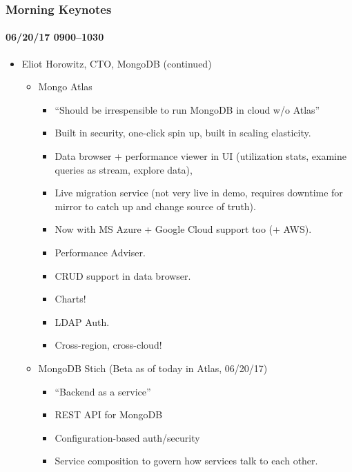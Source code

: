 \documentclass[xcolor=dvipsnames, 9pt]{beamer}
\begin{document}
\begin{frame}
    \frametitle{Morning Keynotes}
    \framesubtitle{06/20/17 0900--1030}
    \begin{itemize}
        \item Eliot Horowitz, CTO, MongoDB (continued)
            \begin{itemize}
                \item Mongo Atlas
                    \begin{itemize}
                        \item ``Should be irrespensible to run MongoDB in cloud
                            w/o Atlas''
                        \item Built in security, one-click spin up, built in
                            scaling elasticity.
                        \item Data browser + performance viewer in UI
                            (utilization stats, examine queries as stream,
                            explore data),
                        \item Live migration service (not very live in demo,
                            requires downtime for mirror to catch up and change
                            source of truth).
                        \item Now with MS Azure + Google Cloud support too (+
                            AWS). \\[9pt]
                        \item Performance Adviser.
                        \item CRUD support in data browser.
                        \item Charts!
                        \item LDAP Auth.
                        \item Cross-region, cross-cloud!
                    \end{itemize}
                \item MongoDB Stich (Beta as of today in Atlas, 06/20/17)
                    \begin{itemize}
                        \item ``Backend as a service''
                        \item REST API for MongoDB
                        \item Configuration-based auth/security
                        \item Service composition to govern how services talk to
                            each other.
                    \end{itemize}
            \end{itemize}
    \end{itemize}
\end{frame}
\end{document}
